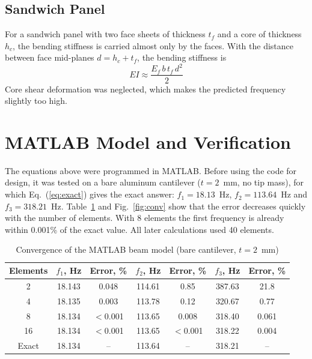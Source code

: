 \documentclass[letterpaper,10pt]{article}
\newcommand{\figref}[1]{Fig.~\ref{#1}}
\begin{document}
\subsection{Sandwich Panel}

For a sandwich panel with two face sheets of thickness $t_f$ and a core of thickness
$h_c$, the bending stiffness is carried almost only by the faces. With the distance
between face mid-planes $d = h_c + t_f$, the bending stiffness is~\cite{zenkert}
\begin{equation}
  EI \approx \frac{E_f\, b\, t_f\, d^2}{2}
\end{equation}
Core shear deformation was neglected, which makes the predicted frequency slightly
too high.

\section{MATLAB Model and Verification}

The equations above were programmed in MATLAB. Before using the code for design,
it was tested on a bare aluminum cantilever ($t = 2$~mm, no tip mass), for which
Eq.~(\ref{eq:exact}) gives the exact answer: $f_1 = 18.13$~Hz, $f_2 = 113.64$~Hz and
$f_3 = 318.21$~Hz. Table~\ref{tab:conv} and \figref{fig:conv} show that the error
decreases quickly with the number of elements. With 8 elements the first frequency
is already within 0.001\% of the exact value. All later calculations used 40 elements.

\begin{table}[H]
\centering
\caption{Convergence of the MATLAB beam model (bare cantilever, $t = 2$~mm)}
\label{tab:conv}
\begin{tabular}{ccccccc}
\toprule
Elements & $f_1$, Hz & Error, \% & $f_2$, Hz & Error, \% & $f_3$, Hz & Error, \% \\
\midrule
2  & 18.143 & 0.048  & 114.61 & 0.85   & 387.63 & 21.8 \\
4  & 18.135 & 0.003  & 113.78 & 0.12   & 320.67 & 0.77 \\
8  & 18.134 & $<$0.001 & 113.65 & 0.008 & 318.40 & 0.061 \\
16 & 18.134 & $<$0.001 & 113.65 & $<$0.001 & 318.22 & 0.004 \\
\midrule
Exact & 18.134 & -- & 113.64 & -- & 318.21 & -- \\
\bottomrule
\end{tabular}
\end{table}
\end{document}
